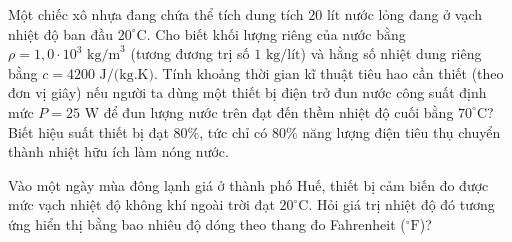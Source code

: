 \begin{ex}%
	Một chiếc xô nhựa đang chứa thể tích dung tích $20\text{ lít}$ nước lỏng đang ở vạch nhiệt độ ban đầu $20^\circ\text{C}$. Cho biết khối lượng riêng của nước bằng $\rho = 1,0 \cdot 10^3\text{ kg/m}^3$ (tương đương trị số $1\text{ kg/lít}$) và hằng số nhiệt dung riêng bằng $c = 4200\text{ J/(kg.K)}$. Tính khoảng thời gian kĩ thuật tiêu hao cần thiết (theo đơn vị giây) nếu người ta dùng một thiết bị điện trở đun nước công suất định mức $P = 25\text{ W}$ để đun lượng nước trên đạt đến thềm nhiệt độ cuối bằng $70^\circ\text{C}$? Biết hiệu suất thiết bị đạt $80\%$, tức chỉ có $80\%$ năng lượng điện tiêu thụ chuyển thành nhiệt hữu ích làm nóng nước.
\end{ex}

\begin{ex}%
	Vào một ngày mùa đông lạnh giá ở thành phố Huế, thiết bị cảm biến đo được mức vạch nhiệt độ không khí ngoài trời đạt $20^\circ\text{C}$. Hỏi giá trị nhiệt độ đó tương ứng hiển thị bằng bao nhiêu độ dóng theo thang đo Fahrenheit ($^\circ\text{F}$)?
\end{ex}

